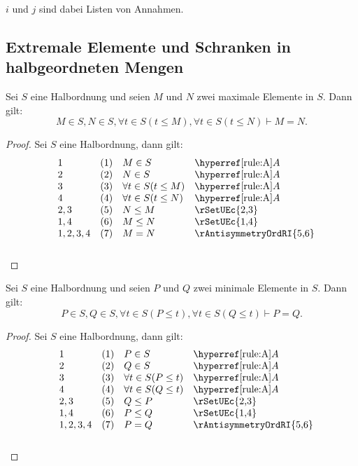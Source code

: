\documentclass[main.tex]{subfiles}
\begin{document}
\(i\) und \(j\) sind dabei Listen von Annahmen.

\subsection{Extremale Elemente und Schranken in halbgeordneten Mengen}


\label{MInSwNInSwFatInSLptLeqMRpwFatInSLptLeqNRpImpMEqualsN}
\begin{theorem}
    Sei \( S \) eine Halbordnung und seien \( M \) und \( N \) zwei maximale Elemente in \( S \). Dann gilt:
    \[
    M\in S, N\in S, \forall t \in S(t \leq M), \forall t \in S(t \leq N) \vdash M = N.
    \]
\end{theorem}

\begin{proof}
    Sei \(S\) eine Halbordnung, dann gilt:
    \[
    \begin{array}{lll p{4cm}}
        1 & (1) & M\in S & \rA \\
        2 & (2) & N\in S & \rA \\
        3 & (3) & \forall t \in S(t \leq M) & \rA \\
        4 & (4) & \forall t \in S(t \leq N) & \rA \\
        2,3 & (5) & N\leq M & \rSetUEc{2,3}  \\
        1,4 & (6) & M\leq N & \rSetUEc{1,4} \\
        1,2,3,4 & (7) & M = N & \rAntisymmetryOrdRI{5,6} \\
    \end{array}
    \]
\end{proof}

\label{PInSwQInSwFatInSLpPLeqtRpwFatInSLpQLeqtRpImpPEqualsQ}
\begin{theorem}
    Sei \( S \) eine Halbordnung und seien \( P \) und \( Q \) zwei minimale Elemente in \( S \). Dann gilt:
    \[
    P \in S, Q \in S, \forall t \in S(P \leq t), \forall t \in S(Q \leq t) \vdash P = Q.
    \]
\end{theorem}

\begin{proof}
    Sei \(S\) eine Halbordnung, dann gilt:
    \[
    \begin{array}{lll p{4cm}}
        1 & (1) & P \in S & \rA \\
        2 & (2) & Q \in S & \rA \\
        3 & (3) & \forall t \in S (P \leq t) & \rA \\
        4 & (4) & \forall t \in S (Q \leq t) & \rA \\
        2,3 & (5) & Q \leq P & \rSetUEc{2,3}  \\
        1,4 & (6) & P \leq Q & \rSetUEc{1,4} \\
        1,2,3,4 & (7) & P = Q & \rAntisymmetryOrdRI{5,6} \\
    \end{array}
    \]
\end{proof}
\end{document}
